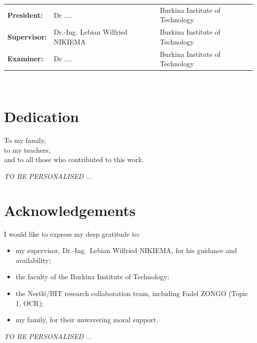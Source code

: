 \documentclass[12pt]{report}
\newcommand{\todo}[1]{\textsl{\colorbox[rgb]{1,1,0}{#1}}}
\begin{document}
\begin{titlepage}
\begin{tabular}{p{} p{} p{}}
\textbf{President:} & Dr .... & Burkina Institute of Technology\\
\textbf{Supervisor:} & Dr.-Ing. Lebian Wilfried NIKIEMA & Burkina Institute of Technology\\
\textbf{Examiner:} & Dr .... & Burkina Institute of Technology\\
\end{tabular}
\\
\end{titlepage}

\newpage
\section*{Dedication}
\setcounter{page}{2}
\thispagestyle{fancy}
\vspace{2cm}
\begin{center}
To my family,\\
to my teachers,\\
and to all those who contributed to this work.
\end{center}
\todo{TO BE PERSONALISED ...}

\newpage
{}

\section*{Acknowledgements}
I would like to express my deep gratitude to:
\begin{itemize}
    \item my supervisor, Dr.-Ing.\ Lebian Wilfried NIKIEMA, for his guidance and availability;
    \item the faculty of the Burkina Institute of Technology;
    \item the Nestl\'e/BIT research collaboration team, including Fadel ZONGO (Topic 1, OCR);
    \item my family, for their unwavering moral support.
\end{itemize}
\todo{TO BE PERSONALISED ...}
\thispagestyle{fancy}

\newpage
{}
\end{document}
